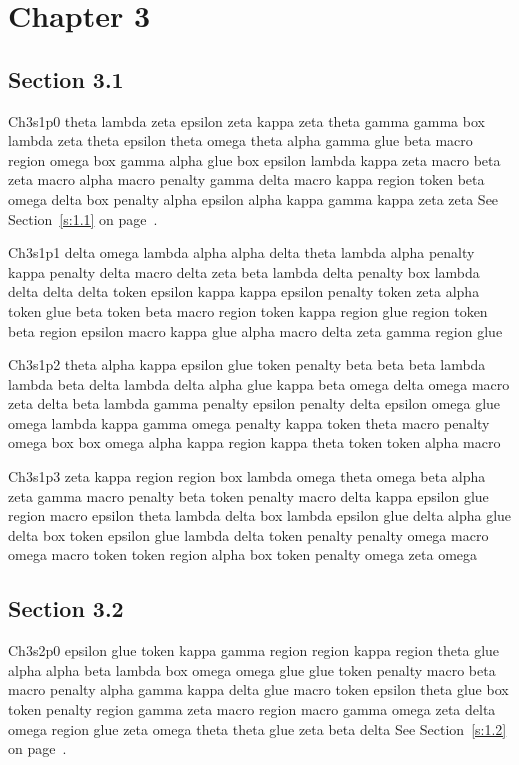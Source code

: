 \chapter{Chapter 3}\label{ch:3}
\section{Section 3.1}\label{s:3.1}
Ch3s1p0 theta lambda zeta epsilon zeta kappa zeta theta gamma gamma box lambda zeta theta epsilon theta omega theta alpha gamma glue beta macro region omega box gamma alpha glue box epsilon lambda kappa zeta macro beta zeta macro alpha macro penalty gamma delta macro kappa region token beta omega delta box penalty alpha epsilon alpha kappa gamma kappa zeta zeta See Section~\ref{s:1.1} on page~\pageref{s:1.1}.

Ch3s1p1 delta omega lambda alpha alpha delta theta lambda alpha penalty kappa penalty delta macro delta zeta beta lambda delta penalty box lambda delta delta delta token epsilon kappa kappa epsilon penalty token zeta alpha token glue beta token beta macro region token kappa region glue region token beta region epsilon macro kappa glue alpha macro delta zeta gamma region glue

Ch3s1p2 theta alpha kappa epsilon glue token penalty beta beta beta lambda lambda beta delta lambda delta alpha glue kappa beta omega delta omega macro zeta delta beta lambda gamma penalty epsilon penalty delta epsilon omega glue omega lambda kappa gamma omega penalty kappa token theta macro penalty omega box box omega alpha kappa region kappa theta token token alpha macro

Ch3s1p3 zeta kappa region region box lambda omega theta omega beta alpha zeta gamma macro penalty beta token penalty macro delta kappa epsilon glue region macro epsilon theta lambda delta box lambda epsilon glue delta alpha glue delta box token epsilon glue lambda delta token penalty penalty omega macro omega macro token token region alpha box token penalty omega zeta omega

\section{Section 3.2}\label{s:3.2}
Ch3s2p0 epsilon glue token kappa gamma region region kappa region theta glue alpha alpha beta lambda box omega omega glue glue token penalty macro beta macro penalty alpha gamma kappa delta glue macro token epsilon theta glue box token penalty region gamma zeta macro region macro gamma omega zeta delta omega region glue zeta omega theta theta glue zeta beta delta See Section~\ref{s:1.2} on page~\pageref{s:1.2}.


